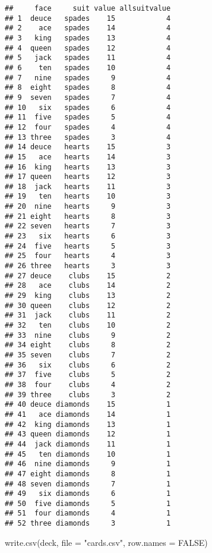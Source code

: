 \documentclass[
]{article}
\newenvironment{Shaded}{\begin{snugshade}}{\end{snugshade}}
\newcommand{\AttributeTok}[1]{\textcolor[rgb]{0.77,0.63,0.00}{#1}}
\newcommand{\ConstantTok}[1]{\textcolor[rgb]{0.00,0.00,0.00}{#1}}
\newcommand{\FunctionTok}[1]{\textcolor[rgb]{0.00,0.00,0.00}{#1}}
\newcommand{\NormalTok}[1]{#1}
\newcommand{\StringTok}[1]{\textcolor[rgb]{0.31,0.60,0.02}{#1}}
\begin{document}
\begin{verbatim}
##     face     suit value allsuitvalue
## 1  deuce   spades    15            4
## 2    ace   spades    14            4
## 3   king   spades    13            4
## 4  queen   spades    12            4
## 5   jack   spades    11            4
## 6    ten   spades    10            4
## 7   nine   spades     9            4
## 8  eight   spades     8            4
## 9  seven   spades     7            4
## 10   six   spades     6            4
## 11  five   spades     5            4
## 12  four   spades     4            4
## 13 three   spades     3            4
## 14 deuce   hearts    15            3
## 15   ace   hearts    14            3
## 16  king   hearts    13            3
## 17 queen   hearts    12            3
## 18  jack   hearts    11            3
## 19   ten   hearts    10            3
## 20  nine   hearts     9            3
## 21 eight   hearts     8            3
## 22 seven   hearts     7            3
## 23   six   hearts     6            3
## 24  five   hearts     5            3
## 25  four   hearts     4            3
## 26 three   hearts     3            3
## 27 deuce    clubs    15            2
## 28   ace    clubs    14            2
## 29  king    clubs    13            2
## 30 queen    clubs    12            2
## 31  jack    clubs    11            2
## 32   ten    clubs    10            2
## 33  nine    clubs     9            2
## 34 eight    clubs     8            2
## 35 seven    clubs     7            2
## 36   six    clubs     6            2
## 37  five    clubs     5            2
## 38  four    clubs     4            2
## 39 three    clubs     3            2
## 40 deuce diamonds    15            1
## 41   ace diamonds    14            1
## 42  king diamonds    13            1
## 43 queen diamonds    12            1
## 44  jack diamonds    11            1
## 45   ten diamonds    10            1
## 46  nine diamonds     9            1
## 47 eight diamonds     8            1
## 48 seven diamonds     7            1
## 49   six diamonds     6            1
## 50  five diamonds     5            1
## 51  four diamonds     4            1
## 52 three diamonds     3            1
\end{verbatim}

\begin{Shaded}
\begin{Highlighting}[]
\FunctionTok{write.csv}\NormalTok{(deck, }\AttributeTok{file =} \StringTok{"cards.csv"}\NormalTok{, }\AttributeTok{row.names =} \ConstantTok{FALSE}\NormalTok{)}
\end{Highlighting}
\end{Shaded}
\end{document}
